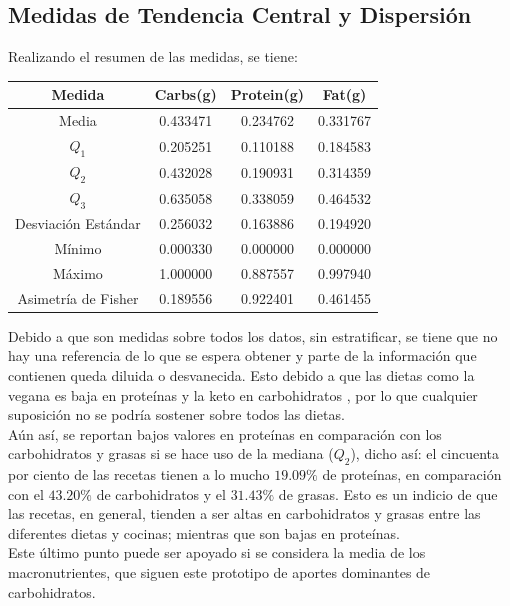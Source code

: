 \documentclass[12pt,a4paper]{article}
\begin{document}
    \subsection{Medidas de Tendencia Central y Dispersión}
    Realizando el resumen de las medidas, se tiene:
    \begin{center}
        \begin{tabular}{|c|ccc|}
            \hline
            Medida & Carbs(g) & Protein(g) & Fat(g) \\
            \hline
            Media               & 0.433471 & 0.234762 & 0.331767 \\
            $Q_1$               & 0.205251 & 0.110188 & 0.184583 \\
            $Q_2$               & 0.432028 & 0.190931 & 0.314359 \\
            $Q_3$               & 0.635058 & 0.338059 & 0.464532 \\
            Desviación Estándar & 0.256032 & 0.163886 & 0.194920 \\
            Mínimo              & 0.000330 & 0.000000 & 0.000000 \\
            Máximo              & 1.000000 & 0.887557 & 0.997940 \\
            Asimetría de Fisher & 0.189556 & 0.922401 & 0.461455 \\
            \hline
        \end{tabular}
    \end{center}
    Debido a que son medidas sobre todos los datos, sin estratificar, 
    se tiene que no hay una referencia de lo que se espera obtener y 
    parte de la información que contienen queda diluida o desvanecida. 
    Esto debido a que las dietas como la vegana es baja en proteínas y 
    la keto en carbohidratos \cite{marvastipopular}, por lo que cualquier 
    suposición no se podría sostener sobre todos las dietas.\\

    Aún así, se reportan bajos valores en proteínas en comparación 
    con los carbohidratos y grasas si se hace uso de la mediana ($Q_2$), 
    dicho así: el cincuenta por ciento de las recetas tienen a lo mucho  
    $19.09\%$ de proteínas, en comparación con el $43.20\%$ de carbohidratos 
    y el $31.43\%$ de grasas. Esto es un indicio de que las recetas, en general, 
    tienden a ser altas en carbohidratos y grasas entre las diferentes dietas y 
    cocinas; mientras que son bajas en proteínas.\\
    Este último punto puede ser apoyado si se considera la media de los 
    macronutrientes, que siguen este prototipo de aportes dominantes de 
    carbohidratos.\\
\end{document}
